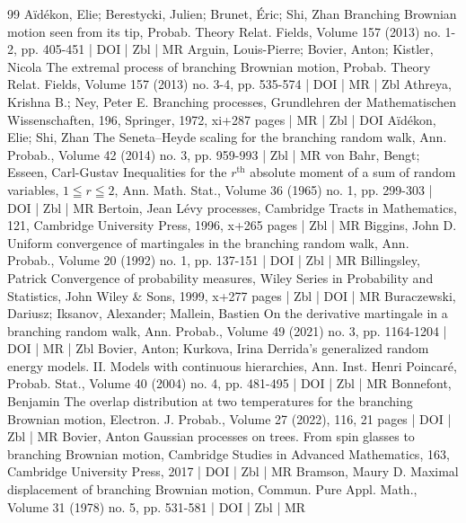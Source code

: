 \begin{thebibliography}{99}
 Aïdékon, Elie; Berestycki, Julien; Brunet, Éric; Shi, Zhan Branching Brownian motion seen from its tip, Probab. Theory Relat. Fields, Volume 157 (2013) no. 1-2, pp. 405-451 | DOI | Zbl | MR
 Arguin, Louis-Pierre; Bovier, Anton; Kistler, Nicola The extremal process of branching Brownian motion, Probab. Theory Relat. Fields, Volume 157 (2013) no. 3-4, pp. 535-574 | DOI | MR | Zbl
 Athreya, Krishna B.; Ney, Peter E. Branching processes, Grundlehren der Mathematischen Wissenschaften, 196, Springer, 1972, xi+287 pages | MR | Zbl | DOI
 Aïdékon, Elie; Shi, Zhan The Seneta–Heyde scaling for the branching random walk, Ann. Probab., Volume 42 (2014) no. 3, pp. 959-993 | Zbl | MR
 von Bahr, Bengt; Esseen, Carl-Gustav Inequalities for the $r^{\text{th}}$ absolute moment of a sum of random variables, $1 \leqq r \leqq 2$, Ann. Math. Stat., Volume 36 (1965) no. 1, pp. 299-303 | DOI | Zbl | MR
 Bertoin, Jean Lévy processes, Cambridge Tracts in Mathematics, 121, Cambridge University Press, 1996, x+265 pages | Zbl | MR
 Biggins, John D. Uniform convergence of martingales in the branching random walk, Ann. Probab., Volume 20 (1992) no. 1, pp. 137-151 | DOI | Zbl | MR
 Billingsley, Patrick Convergence of probability measures, Wiley Series in Probability and Statistics, John Wiley \& Sons, 1999, x+277 pages | Zbl | DOI | MR
 Buraczewski, Dariusz; Iksanov, Alexander; Mallein, Bastien On the derivative martingale in a branching random walk, Ann. Probab., Volume 49 (2021) no. 3, pp. 1164-1204 | DOI | MR | Zbl
 Bovier, Anton; Kurkova, Irina Derrida’s generalized random energy models. II. Models with continuous hierarchies, Ann. Inst. Henri Poincaré, Probab. Stat., Volume 40 (2004) no. 4, pp. 481-495 | DOI | Zbl | MR
 Bonnefont, Benjamin The overlap distribution at two temperatures for the branching Brownian motion, Electron. J. Probab., Volume 27 (2022), 116, 21 pages | DOI | Zbl | MR
 Bovier, Anton Gaussian processes on trees. From spin glasses to branching Brownian motion, Cambridge Studies in Advanced Mathematics, 163, Cambridge University Press, 2017 | DOI | Zbl | MR
 Bramson, Maury D. Maximal displacement of branching Brownian motion, Commun. Pure Appl. Math., Volume 31 (1978) no. 5, pp. 531-581 | DOI | Zbl | MR

\end{thebibliography}
